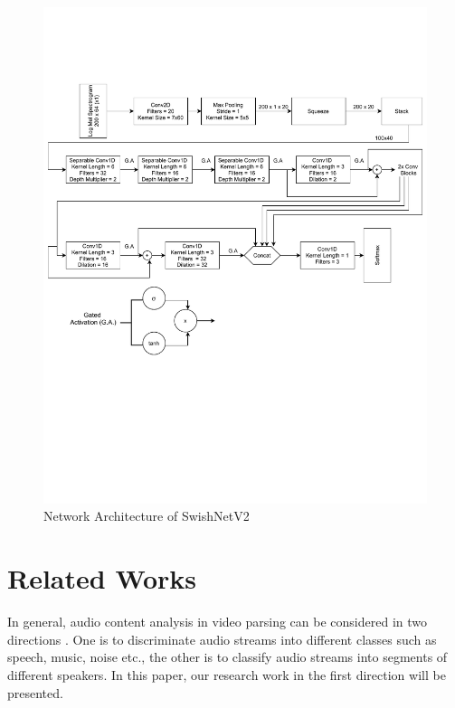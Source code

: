 \documentclass{article}
\begin{document}
\begin{figure}[!t]
	\centering
	\includegraphics[width=\textwidth, trim= 0 230 0 100, clip]{Network.pdf}
	\caption{Network Architecture of SwishNetV2}
	\label{fig:swishnet}
\end{figure}

\section{Related Works}
In general, audio content analysis in video parsing can be considered in two directions \cite{srinivasan1999towards, liu1998audio}. One is to discriminate audio streams into different classes such as speech, music, noise etc., the other is to classify audio streams into segments of different speakers. In this paper, our research work in the first direction will be presented. 
\end{document}
